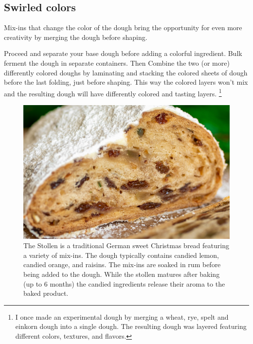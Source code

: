 \subsection{Swirled colors}
Mix-ins that change the color of the dough bring the opportunity for even more
creativity by merging the dough before shaping.

Proceed and separate your base dough before adding a colorful ingredient. Bulk
ferment the dough in separate containers. Then Combine the two (or
more) differently colored doughs by laminating and stacking the colored sheets
of dough before the last folding, just before shaping. This way the colored
layers won't mix and the resulting dough will have differently colored and
tasting layers. \footnote{I once made an experimental dough by merging a wheat,
rye, spelt and einkorn dough into a single dough. The resulting dough was
layered featuring different colors, textures, and flavors.}

\begin{figure}[htb!]
  \includegraphics[width=\textwidth]{stollen-close-up}
  \caption[Stollen closeup]{The Stollen is a traditional German sweet Christmas
    bread featuring a variety of mix-ins. The dough typically contains candied lemon,
    candied orange, and raisins. The mix-ins are soaked in rum before being added to
    the dough. While the stollen matures after baking (up to \num{6} months) the candied ingredients release
    their aroma to the baked product.}%
\end{figure}
